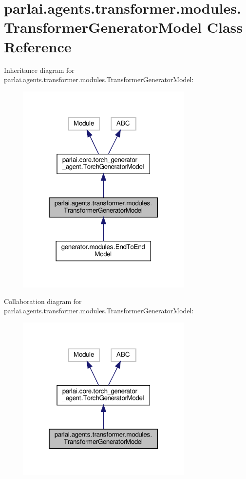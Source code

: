 \hypertarget{classparlai_1_1agents_1_1transformer_1_1modules_1_1TransformerGeneratorModel}{}\section{parlai.\+agents.\+transformer.\+modules.\+Transformer\+Generator\+Model Class Reference}
\label{classparlai_1_1agents_1_1transformer_1_1modules_1_1TransformerGeneratorModel}


Inheritance diagram for parlai.\+agents.\+transformer.\+modules.\+Transformer\+Generator\+Model\+:
\nopagebreak
\begin{figure}[H]
\begin{center}
\leavevmode
\includegraphics[width=247pt]{classparlai_1_1agents_1_1transformer_1_1modules_1_1TransformerGeneratorModel__inherit__graph}
\end{center}
\end{figure}


Collaboration diagram for parlai.\+agents.\+transformer.\+modules.\+Transformer\+Generator\+Model\+:
\nopagebreak
\begin{figure}[H]
\begin{center}
\leavevmode
\includegraphics[width=247pt]{classparlai_1_1agents_1_1transformer_1_1modules_1_1TransformerGeneratorModel__coll__graph}
\end{center}
\end{figure}

